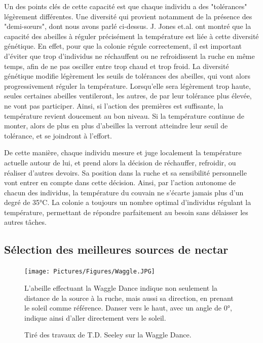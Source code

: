 			Un des points clés de cette capacité est que chaque individu a des "tolérances" légèrement différentes. Une diversité qui provient notamment de la présence des "demi-sœurs", dont nous avons parlé ci-dessus. J. Jones et.al. \cite{jones_honey_2004} ont montré que la capacité des abeilles à réguler précisément la température est liée à cette diversité génétique. En effet, pour que la colonie régule correctement, il est important d'éviter que trop d'individus ne réchauffent ou ne refroidissent la ruche en même temps, afin de ne pas osciller entre trop chaud et trop froid. La diversité génétique modifie légèrement les seuils de tolérances des abeilles, qui vont alors progressivement réguler la température. Lorsqu'elle sera légèrement trop haute, seules certaines abeilles ventileront, les autres, de par leur tolérance plus élevée, ne vont pas participer. Ainsi, si l'action des premières est suffisante, la température revient doucement au bon niveau. Si la température continue de monter, alors de plus en plus d'abeilles la verront atteindre leur seuil de tolérance, et se joindront à l'effort.
			
			De cette manière, chaque individu mesure et juge localement la température actuelle autour de lui, et prend alors la décision de réchauffer, refroidir, ou réaliser d'autres devoirs. Sa position dans la ruche et sa sensibilité personnelle vont entrer en compte dans cette décision. Ainsi, par l'action autonome de chacun des individus, la température du couvain ne s'écarte jamais plus d'un degré de 35°C. La colonie a toujours un nombre optimal d'individus régulant la température, permettant de répondre parfaitement au besoin sans délaisser les autres tâches.
			
			\subsection{Sélection des meilleures sources de nectar}
			
			\begin{figure}
			\centering
			\texttt{[image: Pictures/Figures/Waggle.JPG]}
				\caption{Tiré des travaux de T.D. Seeley \cite{seeley_wisdom_1995} sur la Waggle Dance.}{ L'abeille effectuant la Waggle Dance indique non seulement la distance de la source à la ruche, mais aussi sa direction, en prenant le soleil comme référence. Danser vers le haut, avec un angle de 0°, indique ainsi d'aller directement vers le soleil.}
			\label{Waggle}
			\end{figure}
			
